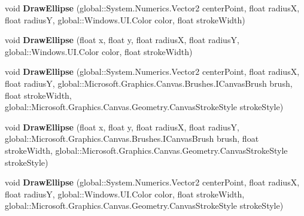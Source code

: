 \begin{DoxyCompactItemize}
\item 
\mbox{\label{interface_microsoft_1_1_graphics_1_1_canvas_1_1_i_canvas_drawing_session_a850410c107d5f9f16b6774e335882f54}} 
void {\bfseries Draw\+Ellipse} (global\+::\+System.\+Numerics.\+Vector2 center\+Point, float radiusX, float radiusY, global\+::\+Windows.\+U\+I.\+Color color, float stroke\+Width)
\item 
\mbox{\label{interface_microsoft_1_1_graphics_1_1_canvas_1_1_i_canvas_drawing_session_a02e1b706897eed3f7dd80163aa2277e2}} 
void {\bfseries Draw\+Ellipse} (float x, float y, float radiusX, float radiusY, global\+::\+Windows.\+U\+I.\+Color color, float stroke\+Width)
\item 
\mbox{\label{interface_microsoft_1_1_graphics_1_1_canvas_1_1_i_canvas_drawing_session_aacdef05a2582c36a0d75c08d97c16c6f}} 
void {\bfseries Draw\+Ellipse} (global\+::\+System.\+Numerics.\+Vector2 center\+Point, float radiusX, float radiusY, global\+::\+Microsoft.\+Graphics.\+Canvas.\+Brushes.\+I\+Canvas\+Brush brush, float stroke\+Width, global\+::\+Microsoft.\+Graphics.\+Canvas.\+Geometry.\+Canvas\+Stroke\+Style stroke\+Style)
\item 
\mbox{\label{interface_microsoft_1_1_graphics_1_1_canvas_1_1_i_canvas_drawing_session_aa5fd69dc45450363edef8b82b4c82741}} 
void {\bfseries Draw\+Ellipse} (float x, float y, float radiusX, float radiusY, global\+::\+Microsoft.\+Graphics.\+Canvas.\+Brushes.\+I\+Canvas\+Brush brush, float stroke\+Width, global\+::\+Microsoft.\+Graphics.\+Canvas.\+Geometry.\+Canvas\+Stroke\+Style stroke\+Style)
\item 
\mbox{\label{interface_microsoft_1_1_graphics_1_1_canvas_1_1_i_canvas_drawing_session_aa779cbf1f28162d97b3f19dd267c2a8f}} 
void {\bfseries Draw\+Ellipse} (global\+::\+System.\+Numerics.\+Vector2 center\+Point, float radiusX, float radiusY, global\+::\+Windows.\+U\+I.\+Color color, float stroke\+Width, global\+::\+Microsoft.\+Graphics.\+Canvas.\+Geometry.\+Canvas\+Stroke\+Style stroke\+Style)

\end{DoxyCompactItemize}
